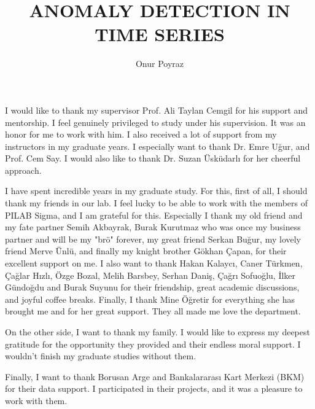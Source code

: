 \documentclass[a4paper,oneside,12pt]{report}
\title{ANOMALY DETECTION IN TIME SERIES}
\author{Onur Poyraz}
\begin{document}
\makemstitle %
\makeapprovalpage

\begin{acknowledgements}
I would like to thank my supervisor Prof. Ali Taylan Cemgil for his support and mentorship. I feel genuinely privileged to study under his supervision. It was an honor for me to work with him. I also received a lot of support from my instructors in my graduate years. I especially want to thank Dr. Emre Uğur, and Prof. Cem Say. I would also like to thank Dr. Suzan Üsküdarlı for her cheerful approach.

I have spent incredible years in my graduate study. For this, first of all, I should thank my friends in our lab. I feel lucky to be able to work with the members of PILAB Sigma, and I am grateful for this. Especially I thank my old friend and my fate partner Semih Akbayrak, Burak Kurutmaz who was once my business partner and will be my "brö" forever, my great friend Serkan Buğur, my lovely friend Merve Ünlü, and finally my knight brother Gökhan Çapan, for their excellent support on me. I also want to thank Hakan Kalaycı, Caner Türkmen, Çağlar Hızlı, Özge Bozal, Melih Barsbey, Serhan Daniş, Çağrı Sofuoğlu, İlker Gündoğdu and Burak Suyunu for their friendship, great academic discussions, and joyful coffee breaks. Finally, I thank Mine Öğretir for everything she has brought me and for her great support. They all made me love the department.

On the other side, I want to thank my family. I would like to express my deepest gratitude for the opportunity they provided and their endless moral support. I wouldn't finish my graduate studies without them.

Finally, I want to thank Borusan Arge and Bankalararası Kart Merkezi (BKM) for their data support. I participated in their projects, and it was a pleasure to work with them.
\end{acknowledgements}
\end{document}
